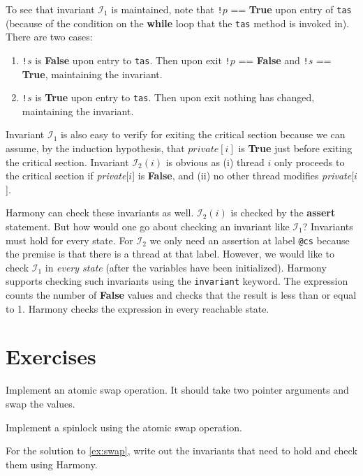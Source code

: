 \documentclass{report}
\begin{document}
To see that invariant $\mathcal{I}_1$ is maintained, note that
\texttt{!}$p$ == \textbf{True} upon entry of \texttt{tas}
(because of the condition on the \textbf{while} loop that the
\texttt{tas} method is invoked in).
There are two cases:
\begin{enumerate}
\item \texttt{!}$s$ is \textbf{False} upon entry to \texttt{tas}.
Then upon exit \texttt{!}$p$ == \textbf{False} and \texttt{!}$s$ == \textbf{True},
maintaining the invariant.
\item \texttt{!}$s$ is \textbf{True} upon entry to \texttt{tas}.
Then upon exit nothing has changed, maintaining the invariant.
\end{enumerate}
Invariant $\mathcal{I}_1$ is also easy to verify for exiting the critical section
because we can assume, by the induction hypothesis, that $\textit{private}[i]$ is
\textbf{True} just before exiting the critical section.
Invariant $\mathcal{I}_2(i)$ is obvious as (i) thread $i$ only proceeds to the critical
section if \textit{private}[$i$] is \textbf{False}, and (ii) no other thread modifies
\textit{private}[$i$].

Harmony can check these invariants as well.
$\mathcal{I}_2(i)$ is checked by the \textbf{assert} statement.
But how would one go about checking an
invariant like $\mathcal{I}_1$?  Invariants must hold for every state.
For $\mathcal{I}_2$ we only need an assertion at label \texttt{@cs} because the
premise is that there is a thread at that label.  However, we would
like to check $\mathcal{I}_1$ in \emph{every state} (after the variables have
been initialized).
Harmony supports checking such invariants using the \texttt{invariant}
keyword.
The expression counts the number of \textbf{False} values and checks that
the result is less than or equal to 1.
Harmony checks the expression in every reachable state.

\section*{Exercises}
\begin{problems}
\item Implement an atomic swap operation.  It should take two pointer arguments
and swap the values.
\item \label{ex:swap} Implement a spinlock using the atomic swap operation.
\item For the solution to \autoref{ex:swap},
write out the invariants that need to hold and check them using Harmony.
\end{problems}
\end{document}
